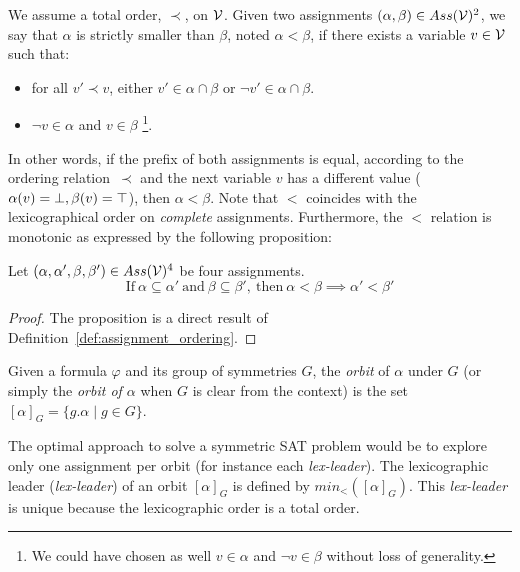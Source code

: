 \begin{definition}\label{def:assignment_ordering}%
 We assume a total order, $\prec$, on $\mathcal{V}$.  Given two assignments $(\alpha,\beta) \in Ass(\mathcal{V})^2 $,%
 we say that $\alpha$ is strictly smaller than $\beta$, noted $\alpha < \beta$, if there exists a variable $v \in \mathcal{V}$%
 such that:%
 \begin{itemize}%
  \item for all $v' \prec v$, either $v' \in \alpha \cap \beta$ or $\neg v' \in \alpha \cap \beta$.%
  \item $\neg v \in \alpha$ and $v \in \beta$ \footnote{We could have chosen as well $v \in \alpha$ and $\neg v \in \beta$ without loss of generality.}.%
 \end{itemize}%
\end{definition}
In other words, if the prefix of both assignments is equal, according to the ordering relation~$\prec$
and the next variable $v$ has a different value ($\alpha(v) = \bot, \beta(v) = \top$), then $\alpha < \beta$.
Note that $<$ coincides with the lexicographical order on \emph{complete}
assignments. 
Furthermore, the $<$ relation is monotonic as expressed by the following proposition:
\begin{proposition}
 \label{prop:monocity_assignments_ordering}
 Let  $(\alpha,\alpha',\beta,\beta') \in Ass(\mathcal{V})^4 $ be four assignments.
 $$\text{If}~\alpha \subseteq \alpha'~\text{and}~\beta \subseteq \beta',~\text{then}~\alpha < \beta \implies \alpha' < \beta'$$
\end{proposition}
\begin{proof}
The proposition is a direct result of Definition~\ref{def:assignment_ordering}.
\end{proof}
Given a formula $\varphi$ and its group of symmetries $G$,
the \emph{orbit} of $\alpha$ under $G$ (or
simply the \emph{orbit of $\alpha$} when $G$ is clear from the context) is the set
$ [\alpha]_G=\{ g.\alpha \mid g \in G \}$. 

The optimal approach to solve a symmetric SAT problem would be to explore
only one assignment per orbit (for instance each \textit{lex-leader}).
The lexicographic leader (\textit{lex-leader}) of an orbit $[\alpha]_G$ is defined by
$min_<([\alpha]_G)$. This \textit{lex-leader} is unique because the lexicographic
order is a total order.
% 

